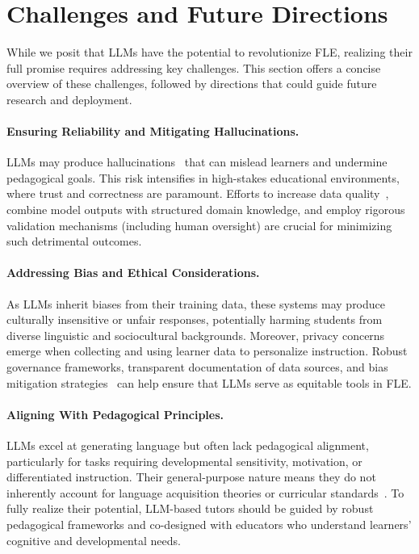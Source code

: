\section{Challenges and Future Directions}\label{sec:challenge}
While we posit that LLMs have the potential to revolutionize FLE, realizing their full promise requires addressing key challenges. This section offers a concise overview of these challenges, followed by directions that could guide future research and deployment.

\paragraph{Ensuring Reliability and Mitigating Hallucinations.}
LLMs may produce hallucinations~\cite{huang2023survey} that can mislead learners and undermine pedagogical goals. This risk intensifies in high-stakes educational environments, where trust and correctness are paramount. Efforts to increase data quality~\cite{long-etal-2024-llms}, combine model outputs with structured domain knowledge, and employ rigorous validation mechanisms (including human oversight) are crucial for minimizing such detrimental outcomes.

\paragraph{Addressing Bias and Ethical Considerations.}
As LLMs inherit biases from their training data, these systems may produce culturally insensitive or unfair responses, potentially harming students from diverse linguistic and sociocultural backgrounds. Moreover, privacy concerns emerge when collecting and using learner data to personalize instruction. Robust governance frameworks, transparent documentation of data sources, and bias mitigation strategies~\cite{borah2024towards} can help ensure that LLMs serve as equitable tools in FLE.

\paragraph{Aligning With Pedagogical Principles.}
LLMs excel at generating language but often lack pedagogical alignment, particularly for tasks requiring developmental sensitivity, motivation, or differentiated instruction. Their general-purpose nature means they do not inherently account for language acquisition theories or curricular standards~\cite{razafinirina2024pedagogical}. To fully realize their potential, LLM-based tutors should be guided by robust pedagogical frameworks and co-designed with educators who understand learners’ cognitive and developmental needs.


